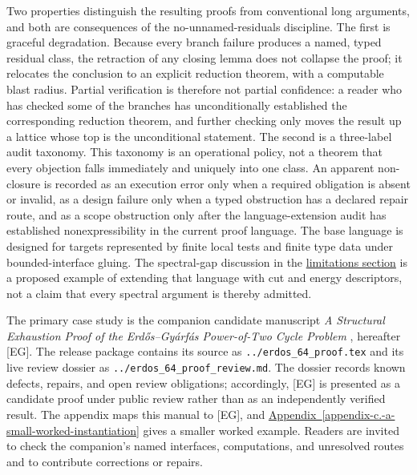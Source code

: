 \documentclass[
  11pt,
]{article}
\theoremstyle{definition}
\newcommand{\appref}[1]{\hyperref[#1]{Appendix~\ref*{#1}}}
\newcommand{\sectextref}[2]{\hyperref[#2]{#1}}
\begin{document}
Two properties distinguish the resulting proofs from conventional long
arguments, and both are consequences of the no-unnamed-residuals
discipline. The first is graceful degradation. Because every branch
failure produces a named, typed residual class, the retraction of any
closing lemma does not collapse the proof; it relocates the conclusion
to an explicit reduction theorem, with a computable blast radius.
Partial verification is therefore not partial confidence: a reader who
has checked some of the branches has unconditionally established the
corresponding reduction theorem, and further checking only moves the
result up a lattice whose top is the unconditional statement. The second
is a three-label audit taxonomy. This taxonomy is an operational policy,
not a theorem that every objection falls immediately and uniquely into
one class. An apparent non-closure is recorded as an execution error only
when a required obligation is absent or invalid, as a design failure only
when a typed obstruction has a declared repair route, and as a scope
obstruction only after the language-extension audit has established
nonexpressibility in the current proof language. The base language is
designed for targets represented by finite local tests and finite type
data under bounded-interface gluing. The spectral-gap discussion in the
\sectextref{limitations section}{limitations} is a proposed example of
extending that language with cut and energy descriptors, not a claim that
every spectral argument is thereby admitted.

The primary case study is the companion candidate manuscript
\emph{A Structural Exhaustion Proof of the Erd\H{o}s--Gy\'arf\'as
Power-of-Two Cycle Problem} \citep{duran-ballester-2026-eg-candidate},
hereafter \textup{[EG]}. The release package contains its source as
\texttt{../erdos\_64\_proof.tex} and its live review dossier as
\texttt{../erdos\_64\_proof\_review.md}. The dossier records known
defects, repairs, and open review obligations; accordingly, [EG] is
presented as a candidate proof under public review rather than as an
independently verified result. The appendix maps this manual to [EG], and
\appref{appendix-c.-a-small-worked-instantiation} gives a smaller worked
example. Readers are invited to check the companion's named interfaces,
computations, and unresolved routes and to contribute corrections or
repairs.
\end{document}
